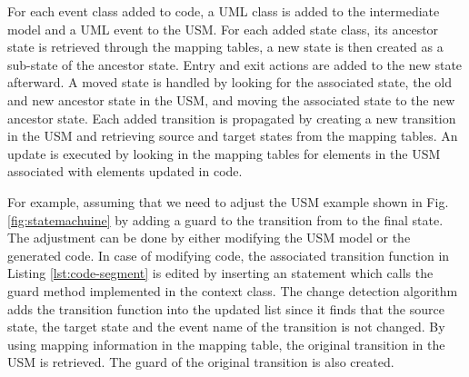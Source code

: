 For each event class added to code, a UML class is added to the intermediate model and a UML event to the USM. For each added state class, its ancestor state is retrieved through the mapping tables, a new state is then created as a sub-state of the ancestor state. Entry and exit actions are added to the new state afterward. A moved state is handled by looking for the associated state, the old and new ancestor state in the USM, and moving the associated state to the new ancestor state. Each added transition is propagated by creating a new transition in the USM and retrieving source and target states from the mapping tables. An update is executed by looking in the mapping tables for elements in the USM associated with elements updated in code. %


  
For example, assuming that we need to adjust the USM example shown in Fig. \ref{fig:statemachuine} by adding a guard to the transition from  to the final state. The adjustment can be done by either modifying the USM model or the generated code. In case of modifying code, the associated transition function in Listing \ref{lst:code-segment} is edited by inserting an  statement which calls the guard method implemented in the context class. The change detection algorithm adds the transition function into the updated list since it finds that the source state, the target state and the event name of the transition is not changed. By using mapping information in the mapping table, the original transition in the USM is retrieved. The guard of the original transition is also created. 	





